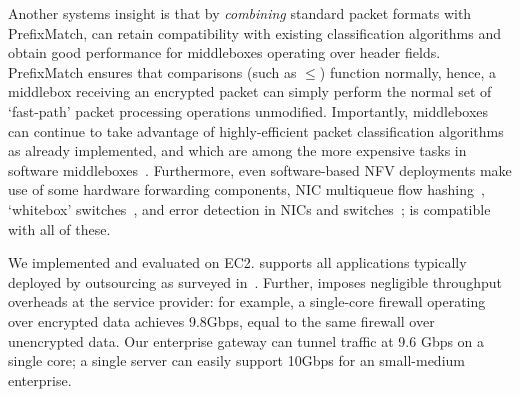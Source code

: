   Another systems insight is that by {\it combining} standard packet formats with PrefixMatch, \sys can retain compatibility with existing classification algorithms and obtain good performance for middleboxes operating over header fields.
  PrefixMatch ensures that comparisons (such as $\leq$) function normally, hence, a middlebox receiving an encrypted packet can simply perform the normal set of `fast-path' packet processing operations unmodified.
  Importantly, middleboxes can continue to take advantage of highly-efficient packet classification algorithms~\cite{packet_classif} as already implemented, and which are among the more expensive tasks in software middleboxes~\cite{comb, ethan-paper}.
  Furthermore, even software-based NFV deployments make use of some hardware forwarding components, \eg{} NIC multiqueue flow hashing~\cite{nicdocument}, `whitebox' switches~\cite{whitebox}, and error detection in NICs and switches~\cite{nicdocument, ciscov6}; \sys is compatible with all of these.
  
 
We implemented and evaluated \sys on EC2. \sys supports all applications typically deployed by outsourcing as surveyed in~\cite{aplomb}.
Further, \sys imposes  negligible throughput overheads at the service provider: for example, a single-core firewall operating over encrypted data achieves 9.8Gbps, equal to the same firewall over unencrypted data.
Our enterprise gateway can tunnel traffic at 9.6 Gbps on a single core;  a single server can easily support 10Gbps for an small-medium enterprise.



